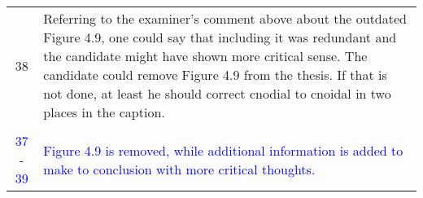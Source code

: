 \documentclass[12pt]{article}
\begin{document}
\begin{center}
\begin{tabularx}{\linewidth}{ c | X }
    & \\
    \hline
     38 & Referring to the examiner’s comment above about the outdated Figure 4.9, one could say that
    including it was redundant and the candidate might have shown more critical sense.
    The candidate could remove Figure 4.9 from the thesis. If that is not done, at least he should correct
    cnodial to cnoidal in two places in the caption.\\
     & \\
    \textcolor{blue}{37 - 39} & \textcolor{blue}{Figure 4.9 is removed, while additional information is added to make to conclusion with more critical thoughts.}\\    

    \end{tabularx}

    \end{center}
    
\end{document}
